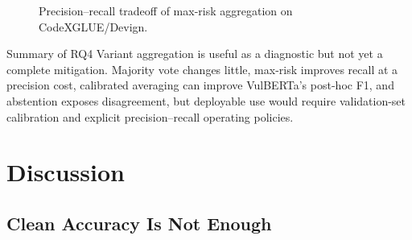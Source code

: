 \documentclass[a4paper,fleqn]{cas-dc}
\begin{document}
\begin{table}[t]
  \centering
  \caption{Post-hoc LineVul threshold sensitivity on CodeXGLUE clean test scores. These diagnostic thresholds are not used for the primary exact-public results.}
  \label{tab:linevul-threshold}
\end{table}

\begin{figure}[t]
  \centering
  
  \caption{Precision--recall tradeoff of max-risk aggregation on CodeXGLUE/Devign.}
  \label{fig:aggregation-tradeoff}
\end{figure}

\begin{rqsummarybox}{Summary of RQ4}
Variant aggregation is useful as a diagnostic but not yet a complete
mitigation. Majority vote changes little, max-risk improves recall at a
precision cost, calibrated averaging can improve VulBERTa's post-hoc F1, and
abstention exposes disagreement, but deployable use would require
validation-set calibration and explicit precision--recall operating policies.
\end{rqsummarybox}

\section{Discussion}

\subsection{Clean Accuracy Is Not Enough}
\end{document}
